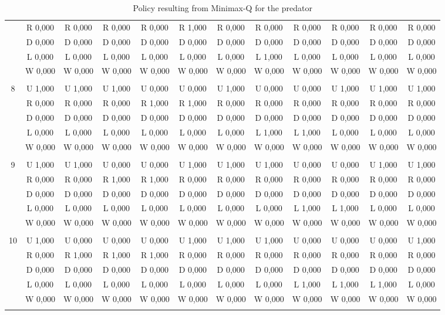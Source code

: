 \begin{table}[htbp]
\begin{tiny}
\begin{tabular}{c|c|c|c|c|c|c|c|c|c|c|c|}
&R 0,000&R 0,000&R 0,000&R 0,000&R 1,000&R 0,000&R 0,000&R 0,000&R 0,000&R 0,000&R 0,000\\
&D 0,000&D 0,000&D 0,000&D 0,000&D 0,000&D 0,000&D 0,000&D 0,000&D 0,000&D 0,000&D 0,000\\
&L 0,000&L 0,000&L 0,000&L 0,000&L 0,000&L 0,000&L 1,000&L 0,000&L 0,000&L 0,000&L 0,000\\
&W 0,000&W 0,000&W 0,000&W 0,000&W 0,000&W 0,000&W 0,000&W 0,000&W 0,000&W 0,000&W 0,000\\
\hline \\
8&U 1,000&U 1,000&U 1,000&U 0,000&U 0,000&U 1,000&U 0,000&U 0,000&U 1,000&U 1,000&U 1,000\\
&R 0,000&R 0,000&R 0,000&R 1,000&R 1,000&R 0,000&R 0,000&R 0,000&R 0,000&R 0,000&R 0,000\\
&D 0,000&D 0,000&D 0,000&D 0,000&D 0,000&D 0,000&D 0,000&D 0,000&D 0,000&D 0,000&D 0,000\\
&L 0,000&L 0,000&L 0,000&L 0,000&L 0,000&L 0,000&L 1,000&L 1,000&L 0,000&L 0,000&L 0,000\\
&W 0,000&W 0,000&W 0,000&W 0,000&W 0,000&W 0,000&W 0,000&W 0,000&W 0,000&W 0,000&W 0,000\\
\hline \\
9&U 1,000&U 1,000&U 0,000&U 0,000&U 1,000&U 1,000&U 1,000&U 0,000&U 0,000&U 1,000&U 1,000\\
&R 0,000&R 0,000&R 1,000&R 1,000&R 0,000&R 0,000&R 0,000&R 0,000&R 0,000&R 0,000&R 0,000\\
&D 0,000&D 0,000&D 0,000&D 0,000&D 0,000&D 0,000&D 0,000&D 0,000&D 0,000&D 0,000&D 0,000\\
&L 0,000&L 0,000&L 0,000&L 0,000&L 0,000&L 0,000&L 0,000&L 1,000&L 1,000&L 0,000&L 0,000\\
&W 0,000&W 0,000&W 0,000&W 0,000&W 0,000&W 0,000&W 0,000&W 0,000&W 0,000&W 0,000&W 0,000\\
\hline \\
10&U 1,000&U 0,000&U 0,000&U 0,000&U 1,000&U 1,000&U 1,000&U 0,000&U 0,000&U 0,000&U 1,000\\
&R 0,000&R 1,000&R 1,000&R 1,000&R 0,000&R 0,000&R 0,000&R 0,000&R 0,000&R 0,000&R 0,000\\
&D 0,000&D 0,000&D 0,000&D 0,000&D 0,000&D 0,000&D 0,000&D 0,000&D 0,000&D 0,000&D 0,000\\
&L 0,000&L 0,000&L 0,000&L 0,000&L 0,000&L 0,000&L 0,000&L 1,000&L 1,000&L 1,000&L 0,000\\
&W 0,000&W 0,000&W 0,000&W 0,000&W 0,000&W 0,000&W 0,000&W 0,000&W 0,000&W 0,000&W 0,000\\
\hline \\
\end{tabular}
\end{tiny}
\caption{Policy resulting from Minimax-Q for the predator}
\end{table}
\clearpage
